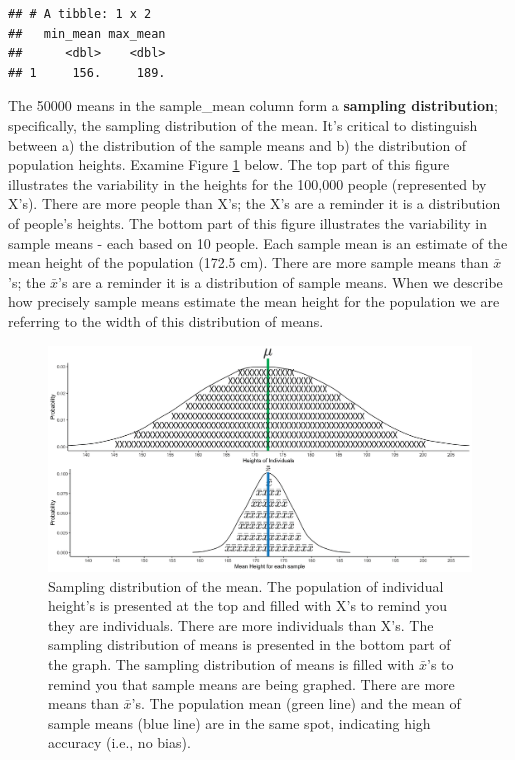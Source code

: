 \documentclass[
]{krantz}
\begin{document}
\begin{verbatim}
## # A tibble: 1 x 2
##   min_mean max_mean
##      <dbl>    <dbl>
## 1     156.     189.
\end{verbatim}

The 50000 means in the sample\_mean column form a \textbf{sampling distribution}; specifically, the sampling distribution of the mean. It's critical to distinguish between a) the distribution of the sample means and b) the distribution of population heights. Examine Figure \ref{fig:bothdist2} below. The top part of this figure illustrates the variability in the heights for the 100,000 people (represented by X's). There are more people than X's; the X's are a reminder it is a distribution of people's heights. The bottom part of this figure illustrates the variability in sample means - each based on 10 people. Each sample mean is an estimate of the mean height of the population (172.5 cm). There are more sample means than \(\bar{x}\)'s; the \(\bar{x}\)'s are a reminder it is a distribution of sample means. When we describe how precisely sample means estimate the mean height for the population we are referring to the width of this distribution of means.

\begin{figure}
\includegraphics[width=0.8\linewidth]{ch_samples_precision/images/sampling_dist} \caption[Sampling distribution of the mean.]{Sampling distribution of the mean. The population of individual height's is presented at the top and filled with X's to remind you they are individuals. There are more individuals than X's. The sampling distribution of means is presented in the bottom part of the graph. The sampling distribution of means is filled with $\bar{x}$'s to remind you that sample means are being graphed. There are more means than $\bar{x}$'s. The population mean (green line) and the mean of sample means (blue line) are in the same spot, indicating high accuracy (i.e., no bias).}\label{fig:bothdist2}
\end{figure}
\end{document}
